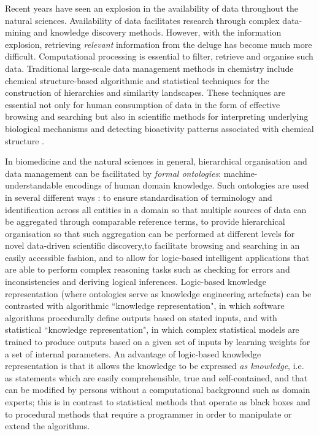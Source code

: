 \documentclass[10pt]{bmc_article}
\newenvironment{bmcformat}{\baselineskip20pt\sloppy\setboolean{publ}{false}}{\baselineskip20pt\sloppy}
\begin{document}
\begin{bmcformat}
Recent years have seen an explosion in the availability of data throughout the natural sciences. Availability of data facilitates research through complex data-mining and knowledge discovery methods. However, with the information explosion, retrieving \textit{relevant} information from the deluge has become much more difficult. Computational processing is essential to filter, retrieve and organise such data. Traditional large-scale data management methods in chemistry include chemical structure-based algorithmic and statistical techniques for the construction of hierarchies and similarity landscapes. These techniques are essential not only for human consumption of data in the form of effective browsing and searching but also in scientific methods for interpreting underlying biological mechanisms and detecting bioactivity patterns associated with chemical structure \cite{cacm2011}. 

In biomedicine and the natural sciences in general, hierarchical organisation and data management can be facilitated by \textit{formal ontologies}: machine-understandable encodings of human domain knowledge. Such ontologies are used in several different ways \cite{lambrix2004,courtotsysbio2011,Harland2011940}: to ensure standardisation of terminology and identification across all entities in a domain so that multiple sources of data can be aggregated through comparable reference terms, to provide hierarchical organisation so that such aggregation can be performed at different levels for novel data-driven scientific discovery,to facilitate browsing and searching in an easily accessible fashion, and to allow for logic-based intelligent applications that are able to perform complex reasoning tasks such as checking for errors and inconsistencies and deriving logical inferences. Logic-based knowledge representation (where ontologies serve as knowledge engineering artefacts) can be contrasted with algorithmic ``knowledge representation", in which software algorithms procedurally define outputs based on stated inputs, and with statistical ``knowledge representation", in which complex statistical models are trained to produce outputs based on a given set of inputs by learning weights for a set of internal parameters.  An advantage of logic-based knowledge representation is that it allows the knowledge to be expressed \textit{as knowledge}, i.e. as statements which are easily comprehensible, true and self-contained, and that can be modified by persons without a computational background such as domain experts; this is in contrast to statistical methods that operate as black boxes and to procedural methods that require a programmer in order to manipulate or extend the algorithms. 


\end{bmcformat}
\end{document}
